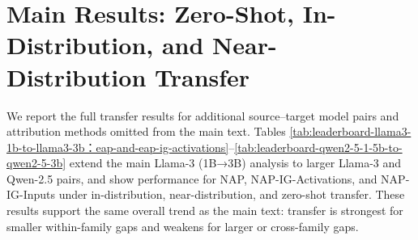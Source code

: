 \documentclass{article} %
\begin{document}









\clearpage


\appendix


\section{Main Results: Zero-Shot, In-Distribution, and Near-Distribution Transfer}

We report the full transfer results for additional source–target model pairs and attribution methods omitted from the main text. Tables \ref{tab:leaderboard-llama3-1b-to-llama3-3b：eap-and-eap-ig-activations}--\ref{tab:leaderboard-qwen2-5-1-5b-to-qwen2-5-3b} extend the main Llama-3 (1B→3B) analysis to larger Llama-3 and Qwen-2.5 pairs, and show performance for NAP, NAP-IG-Activations, and NAP-IG-Inputs under in-distribution, near-distribution, and zero-shot transfer. These results support the same overall trend as the main text: transfer is strongest for smaller within-family gaps and weakens for larger or cross-family gaps.
\end{document}
